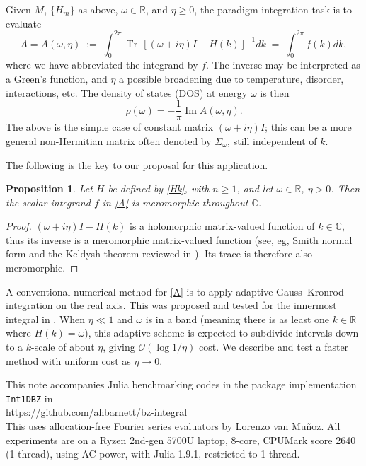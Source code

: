 \documentclass[11pt]{article}
\newcommand{\be}{\begin{equation}}
\newcommand{\ee}{\end{equation}}
\newcommand{\bigO}{{\mathcal O}}
\newcommand{\R}{\mathbb{R}}
\newcommand{\C}{\mathbb{C}}
\DeclareMathOperator{\im}{Im}
\DeclareMathOperator{\tr}{Tr}
\newtheorem{pro}[thm]{Proposition}
\newtheorem{rmk}[thm]{Remark}
\newcommand{\om}{\omega}
\begin{document}
Given $M$, $\{H_m\}$ as above, $\om\in \R$, and $\eta\ge0$,
the paradigm integration task is to evaluate
\be
A = A(\om,\eta) \;:=\;
\int_{0}^{2\pi} \tr\, [(\om +i\eta)I - H(k)]^{-1} dk
\; = \;
\int_{0}^{2\pi} f(k) dk,
\label{A}
\ee
where we have abbreviated the integrand by $f$.
The inverse may be interpreted as a Green's function, and $\eta$
a possible broadening due to temperature, disorder, interactions, etc.
The density of states (DOS) at energy $\om$ is then
\be
\rho(\om) = -\frac{1}{\pi}\im A(\om,\eta).
\label{DOS}
\ee
The above is the simple case of constant matrix $(\om+i\eta)I$; this
can be a more general non-Hermitian matrix often denoted by
$\Sigma_\om$, still independent of $k$.

The following is the key to our proposal for this application.
\begin{pro}
  Let $H$ be defined by \eqref{Hk}, with $n\ge 1$, and let $\om\in\R$, $\eta>0$.
  Then the scalar integrand $f$ in \eqref{A} is meromorphic throughout $\C$.
\end{pro}
\begin{proof}
  $(\omega+i\eta)I - H(k)$ is a holomorphic matrix-valued function of $k\in\C$,
  thus its inverse is a meromorphic matrix-valued function
  (see, eg, Smith normal form and the Keldysh theorem reviewed in
  \cite{beyn12,NEVPrev}).
  Its trace is therefore also meromorphic.
\end{proof}

A conventional numerical method for \eqref{A} is
to apply adaptive Gauss--Kronrod integration on the real axis.
This was proposed and tested for the innermost integral in \cite{autobz}.
When $\eta\ll1$ and $\om$ is in a band (meaning there is as least one
$k\in\R$ where $H(k)=\om$), this adaptive scheme is expected
to subdivide intervals down to a $k$-scale of about $\eta$, giving $\bigO(\log 1/\eta)$ cost.
We describe and test a faster method with uniform cost as $\eta\to 0$.

This note accompanies Julia benchmarking codes in the package implementation
\texttt{Int1DBZ} in\\
\url{https://github.com/ahbarnett/bz-integral}\\
This uses allocation-free Fourier series evaluators by Lorenzo van Mu\~noz.
  All experiments are on a Ryzen 2nd-gen 5700U laptop, 8-core, CPUMark score 2640 (1 thread), using AC power, with Julia 1.9.1, restricted to 1 thread.
\end{document}
